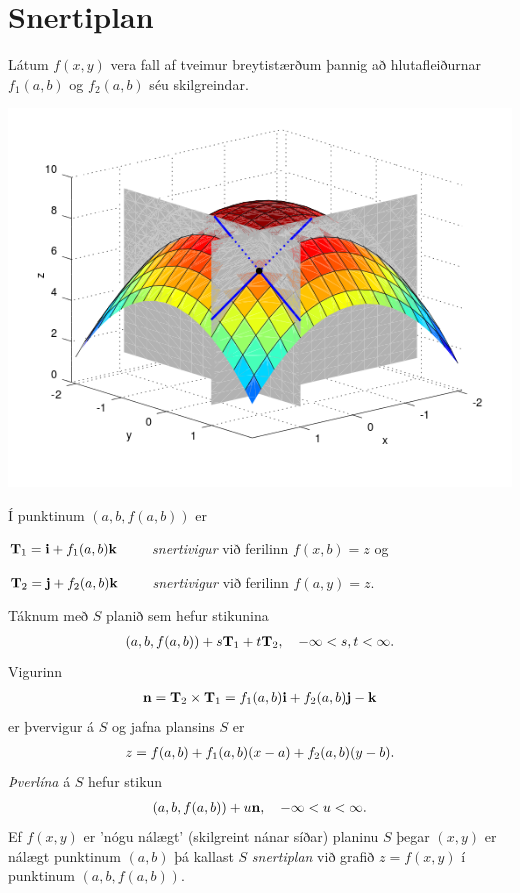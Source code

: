 \documentclass[a4paper,10pt,icelandic]{sphinxmanual}
\begin{document}
\section{Snertiplan}
\label{Kafli2:snertiplan}
Látum \(f(x,y)\) vera fall af tveimur breytistærðum þannig að
hlutafleiðurnar \(f_1(a,b)\) og \(f_2(a,b)\) séu skilgreindar.

{\hfill\includegraphics[width=0.600\linewidth]{bothpart.png}\hfill}

Í punktinum \((a,b,f(a,b))\) er

\(\mbox{${\bf T}$}_1 = \mbox{${\bf i}$}+ f_1(a,b)\mbox{${\bf k}$}\qquad\)
\textit{snertivigur} við ferilinn \(f(x,b) = z\) og

\(\mbox{${\bf T}$}_2 = \mbox{${\bf j}$}+ f_2(a,b)\mbox{${\bf k}$}\qquad\)
\textit{snertivigur} við ferilinn \(f(a,y) = z\).

Táknum með \(S\) planið sem hefur stikunina
\begin{gather}
\begin{split}\displaystyle (a,b,f(a,b))+s\mbox{${\bf T}$}_1+t\mbox{${\bf T}$}_2, \quad -\infty < s,t < \infty.\end{split}\notag
\end{gather}
Vigurinn
\begin{gather}
\begin{split}\displaystyle \mbox{${\bf n}$}=\mbox{${\bf T}$}_2\times \mbox{${\bf T}$}_1=f_1(a,b)\mbox{${\bf i}$}+f_2(a,b)\mbox{${\bf j}$}-\mbox{${\bf k}$}\end{split}\notag
\end{gather}
er þvervigur á \(S\) og jafna plansins \(S\) er
\begin{gather}
\begin{split}\displaystyle z=f(a,b)+f_1(a,b)(x-a)+f_2(a,b)(y-b).\end{split}\notag
\end{gather}
\textit{Þverlína} á \(S\) hefur stikun
\begin{gather}
\begin{split}\displaystyle (a,b,f(a,b)) + u \mbox{${\bf n}$}, \quad -\infty < u < \infty.\end{split}\notag
\end{gather}
Ef \(f(x,y)\) er ’nógu nálægt’ (skilgreint nánar síðar) planinu
\(S\) þegar \((x,y)\) er nálægt punktinum \((a,b)\) þá
kallast \(S\) \textit{snertiplan} við grafið \(z=f(x,y)\) í punktinum
\((a,b,f(a,b))\).
\end{document}
